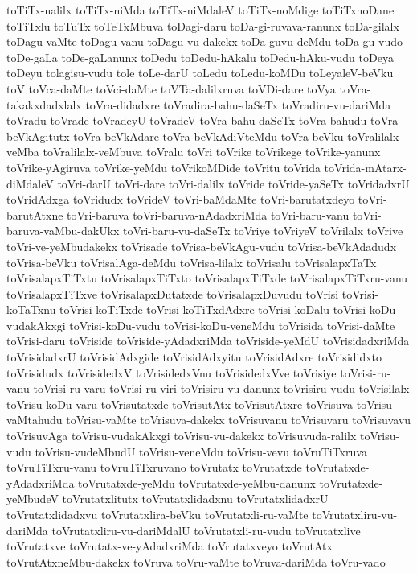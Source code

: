 {toTiTx-nalilx
toTiTx-niMda
toTiTx-niMdaleV
toTiTx-noMdige
toTiTxnoDane
toTiTxlu
toTuTx
toTeTxMbuva
toDagi-daru
toDa-gi-ruvava-ranunx
toDa-gilalx
toDagu-vaMte
toDagu-vanu
toDagu-vu-dakekx
toDa-guvu-deMdu
toDa-gu-vudo
toDe-gaLa
toDe-gaLanunx
toDedu
toDedu-hAkalu
toDedu-hAku-vudu
toDeya
toDeyu
tolagisu-vudu
tole
toLe-darU
toLedu
toLedu-koMDu
toLeyaleV-beVku
toV
toVca-daMte
toVci-daMte
toVTa-dalilxruva
toVDi-dare
toVya
toVra-takakxdadxlalx
toVra-didadxre
toVradira-bahu-daSeTx
toVradiru-vu-dariMda
toVradu
toVrade
toVradeyU
toVradeV
toVra-bahu-daSeTx
toVra-bahudu
toVra-beVkAgitutx
toVra-beVkAdare
toVra-beVkAdiVteMdu
toVra-beVku
toVralilalx-veMba
toVralilalx-veMbuva
toVralu
toVri
toVrike
toVrikege
toVrike-yanunx
toVrike-yAgiruva
toVrike-yeMdu
toVrikoMDide
toVritu
toVrida
toVrida-mAtarx-diMdaleV
toVri-darU
toVri-dare
toVri-dalilx
toVride
toVride-yaSeTx
toVridadxrU
toVridAdxga
toVridudx
toVrideV
toVri-baMdaMte
toVri-barutatxdeyo
toVri-barutAtxne
toVri-baruva
toVri-baruva-nAdadxriMda
toVri-baru-vanu
toVri-baruva-vaMbu-dakUkx
toVri-baru-vu-daSeTx
toVriye
toVriyeV
toVrilalx
toVrive
toVri-ve-yeMbudakekx
toVrisade
toVrisa-beVkAgu-vudu
toVrisa-beVkAdadudx
toVrisa-beVku
toVrisalAga-deMdu
toVrisa-lilalx
toVrisalu
toVrisalapxTaTx
toVrisalapxTiTxtu
toVrisalapxTiTxto
toVrisalapxTiTxde
toVrisalapxTiTxru-vanu
toVrisalapxTiTxve
toVrisalapxDutatxde
toVrisalapxDuvudu
toVrisi
toVrisi-koTaTxnu
toVrisi-koTiTxde
toVrisi-koTiTxdAdxre
toVrisi-koDalu
toVrisi-koDu-vudakAkxgi
toVrisi-koDu-vudu
toVrisi-koDu-veneMdu
toVrisida
toVrisi-daMte
toVrisi-daru
toVriside
toVriside-yAdadxriMda
toVriside-yeMdU
toVrisidadxriMda
toVrisidadxrU
toVrisidAdxgide
toVrisidAdxyitu
toVrisidAdxre
toVrisididxto
toVrisidudx
toVrisidedxV
toVrisidedxVnu
toVrisidedxVve
toVrisiye
toVrisi-ru-vanu
toVrisi-ru-varu
toVrisi-ru-viri
toVrisiru-vu-danunx
toVrisiru-vudu
toVrisilalx
toVrisu-koDu-varu
toVrisutatxde
toVrisutAtx
toVrisutAtxre
toVrisuva
toVrisu-vaMtahudu
toVrisu-vaMte
toVrisuva-dakekx
toVrisuvanu
toVrisuvaru
toVrisuvavu
toVrisuvAga
toVrisu-vudakAkxgi
toVrisu-vu-dakekx
toVrisuvuda-ralilx
toVrisu-vudu
toVrisu-vudeMbudU
toVrisu-veneMdu
toVrisu-vevu
toVruTiTxruva
toVruTiTxru-vanu
toVruTiTxruvano
toVrutatx
toVrutatxde
toVrutatxde-yAdadxriMda
toVrutatxde-yeMdu
toVrutatxde-yeMbu-danunx
toVrutatxde-yeMbudeV
toVrutatxlitutx
toVrutatxlidadxnu
toVrutatxlidadxrU
toVrutatxlidadxvu
toVrutatxlira-beVku
toVrutatxli-ru-vaMte
toVrutatxliru-vu-dariMda
toVrutatxliru-vu-dariMdalU
toVrutatxli-ru-vudu
toVrutatxlive
toVrutatxve
toVrutatx-ve-yAdadxriMda
toVrutatxveyo
toVrutAtx
toVrutAtxneMbu-dakekx
toVruva
toVru-vaMte
toVruva-dariMda
toVru-vado
}
